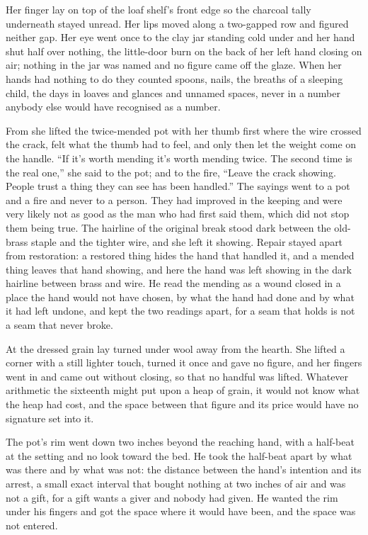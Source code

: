 Her finger lay on top of the loaf shelf's front edge so the charcoal tally underneath stayed unread. Her lips moved along a two-gapped row and figured neither gap. Her eye went once to the clay jar standing cold under  and her hand shut half over nothing, the little-door burn on the back of her left hand closing on air; nothing in the jar was named and no figure came off the glaze. When her hands had nothing to do they counted spoons, nails, the breaths of a sleeping child, the days in loaves and glances and unnamed spaces, never in a number anybody else would have recognised as a number.

From  she lifted the twice-mended pot with her thumb first where the wire crossed the crack, felt what the thumb had to feel, and only then let the weight come on the handle. “If it's worth mending it's worth mending twice. The second time is the real one,” she said to the pot; and to the fire, “Leave the crack showing. People trust a thing they can see has been handled.” The sayings went to a pot and a fire and never to a person. They had improved in the keeping and were very likely not as good as the man who had first said them, which did not stop them being true. The hairline of the original break stood dark between the old-brass staple and the tighter wire, and she left it showing. Repair stayed apart from restoration: a restored thing hides the hand that handled it, and a mended thing leaves that hand showing, and here the hand was left showing in the dark hairline between brass and wire. He read the mending as a wound closed in a place the hand would not have chosen, by what the hand had done and by what it had left undone, and kept the two readings apart, for a seam that holds is not a seam that never broke.

At  the dressed grain lay turned under wool away from the hearth. She lifted a corner with a still lighter touch, turned it once and gave no figure, and her fingers went in and came out without closing, so that no handful was lifted. Whatever arithmetic the sixteenth might put upon a heap of grain, it would not know what the heap had cost, and the space between that figure and its price would have no signature set into it.

The pot's rim went down two inches beyond the reaching hand, with a half-beat at the setting and no look toward the bed. He took the half-beat apart by what was there and by what was not: the distance between the hand's intention and its arrest, a small exact interval that bought nothing at two inches of air and was not a gift, for a gift wants a giver and nobody had given. He wanted the rim under his fingers and got the space where it would have been, and the space was not entered.


